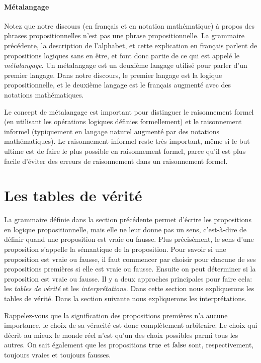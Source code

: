 \paragraph{Métalangage}
Notez que notre discours (en français et en notation mathématique)
à propos des phrases propositionnelles n’est
pas une phrase propositionnelle. La grammaire précédente, la description de
l’alphabet, et cette explication en français parlent de propositions logiques sans en
être, et font donc partie de ce qui est appelé le \textit{métalangage}.
Un métalangage est un deuxième langage utilisé pour parler d'un premier langage.
Dans notre discours, le premier langage est la logique propositionnelle,
et le deuxième langage est le français augmenté avec des notations mathématiques.

Le concept de métalangage est important pour distinguer le raisonnement formel
(en utilisant les opérations logiques définies formellement) et
le raisonnement informel (typiquement en langage naturel augmenté par des notations mathématiques).
Le raisonnement informel reste très important, même si le but ultime est de faire le plus
possible en raisonnement formel, parce qu'il est plus facile d'éviter des erreurs
de raisonnement dans un raisonnement formel.

\section{Les tables de vérité}

La grammaire définie dans la section précédente permet d'écrire
les propositions en logique propositionnelle,
mais elle ne leur donne pas un sens,
c’est-à-dire de définir quand une proposition est vraie ou fausse.
Plus précisément, le sens d'une proposition s'appelle la sémantique
de la proposition.
Pour savoir si une proposition est vraie ou fausse, il faut commencer
par choisir pour chacune de ses propositions premières si elle est vraie ou fausse.
Ensuite on peut déterminer si la proposition est vraie ou fausse.
Il y a deux approches principales pour faire cela:
les {\em tables de vérité} et les {\em interprétations}.
Dans cette section nous expliquerons les tables de vérité.
Dans la section suivante nous expliquerons les interprétations.

Rappelez-vous que la signification des
propositions premières n’a aucune importance, le choix de sa véracité
est donc complètement
arbitraire.
Le choix qui décrit au mieux le monde réel n’est qu’un des choix
possibles parmi tous les autres.
On sait également que les propositions
$\mathrm{true}$ et $\mathrm{false}$ sont, respectivement, toujours vraies et toujours
fausses.

